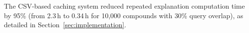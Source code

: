 \documentclass[preprint,12pt]{elsarticle}
\begin{document}








The CSV-based caching system reduced repeated explanation computation time by 95\% (from 2.3\,h to 0.34\,h for 10,000 compounds with 30\% query overlap), as detailed in Section~\ref{sec:implementation}.


\end{document}
